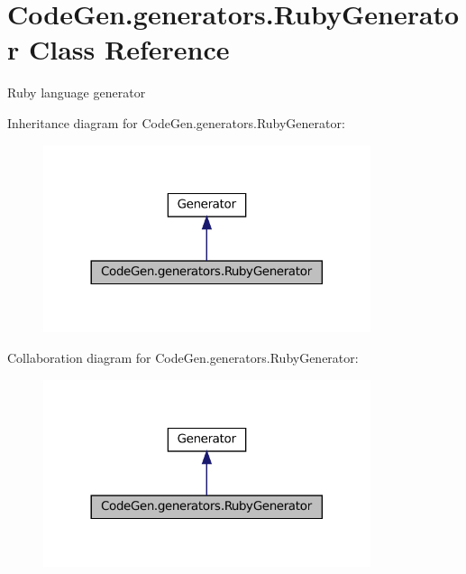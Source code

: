 \hypertarget{classCodeGen_1_1generators_1_1RubyGenerator}{}\section{Code\+Gen.\+generators.\+Ruby\+Generator Class Reference}
\label{classCodeGen_1_1generators_1_1RubyGenerator}


Ruby language generator  




Inheritance diagram for Code\+Gen.\+generators.\+Ruby\+Generator\+:
\nopagebreak
\begin{figure}[H]
\begin{center}
\leavevmode
\includegraphics[width=272pt]{classCodeGen_1_1generators_1_1RubyGenerator__inherit__graph}
\end{center}
\end{figure}


Collaboration diagram for Code\+Gen.\+generators.\+Ruby\+Generator\+:
\nopagebreak
\begin{figure}[H]
\begin{center}
\leavevmode
\includegraphics[width=272pt]{classCodeGen_1_1generators_1_1RubyGenerator__coll__graph}
\end{center}
\end{figure}
